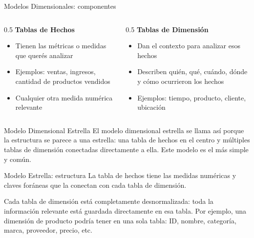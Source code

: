 \documentclass{beamer}
\begin{document}
\begin{frame}{Modelos Dimensionales: componentes}
    \begin{columns}
        \begin{column}{0.5\textwidth}
            \textbf{Tablas de Hechos}
            \begin{itemize}
                \item Tienen las métricas o medidas que querés analizar
                \item Ejemplos: ventas, ingresos, cantidad de productos vendidos
                \item Cualquier otra medida numérica relevante
            \end{itemize}
        \end{column}
        \begin{column}{0.5\textwidth}
            \textbf{Tablas de Dimensión}
            \begin{itemize}
                \item Dan el contexto para analizar esos hechos
                \item Describen quién, qué, cuándo, dónde y cómo ocurrieron los hechos
                \item Ejemplos: tiempo, producto, cliente, ubicación
            \end{itemize}
        \end{column}
    \end{columns}
\end{frame}

\begin{frame}{Modelo Dimensional Estrella}
    El modelo dimensional estrella se llama así porque la estructura se parece a una estrella: una tabla de hechos en el centro y múltiples tablas de dimensión conectadas directamente a ella. Este modelo es el más simple y común.
\end{frame}

\begin{frame}{Modelo Estrella: estructura}
    La tabla de hechos tiene las medidas numéricas y claves foráneas que la conectan con cada tabla de dimensión.
    
    \vspace{0.3cm}
    
    Cada tabla de dimensión está completamente desnormalizada: toda la información relevante está guardada directamente en esa tabla. Por ejemplo, una dimensión de producto podría tener en una sola tabla: ID, nombre, categoría, marca, proveedor, precio, etc.
\end{frame}
\end{document}
